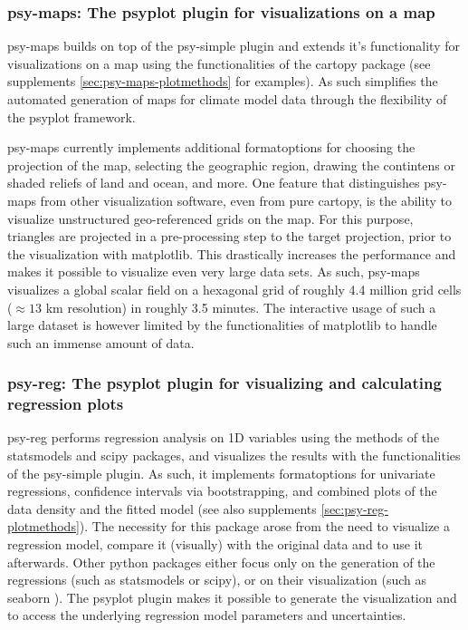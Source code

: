 \begin{refsection}
\subsubsection{psy-maps: The psyplot plugin for visualizations on a map}

psy-maps builds on top of the psy-simple plugin and extends it's functionality for visualizations on a map using the functionalities of the cartopy package \citep{Cartopy} (see supplements \ref{sec:psy-maps-plotmethods} for examples). As such simplifies the automated generation of maps for climate model data through the flexibility of the psyplot framework.

psy-maps currently implements additional formatoptions for choosing the projection of the map, selecting the geographic region, drawing the contintens or shaded reliefs of land and ocean, and more. One feature that distinguishes psy-maps from other visualization software, even from pure cartopy, is the ability to visualize unstructured geo-referenced grids on the map. For this purpose, triangles are projected in a pre-processing step to the target projection, prior to the visualization with matplotlib. This drastically increases the performance and makes it possible to visualize even very large data sets. As such, psy-maps visualizes a global scalar field on a hexagonal grid of roughly 4.4 million grid cells ($\approx 13$ km resolution) in roughly 3.5 minutes. The interactive usage of such a large dataset is however limited by the functionalities of matplotlib to handle such an immense amount of data.

\subsubsection{psy-reg: The psyplot plugin for visualizing and calculating regression plots}

psy-reg performs regression analysis on 1D variables using the methods of the statsmodels \citep{SeaboldPerktold2010} and scipy \citep{JonesOliphantPetersonEtAl2001, Oliphant2007} packages, and visualizes the results with the functionalities of the psy-simple plugin. As such, it implements formatoptions for univariate regressions, confidence intervals via bootstrapping, and combined plots of the data density and the fitted model (see also supplements \ref{sec:psy-reg-plotmethods}). The necessity for this package arose from the need to visualize a regression model, compare it (visually) with the original data and to use it afterwards. Other python packages either focus only on the generation of the regressions (such as statsmodels or scipy), or on their visualization (such as seaborn \citep{WaskomBotvinnikOKaneEtAl2018}). The psyplot plugin makes it possible to generate the visualization and to access the underlying regression model parameters and uncertainties.


\end{refsection}
